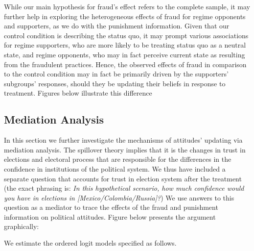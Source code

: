 \documentclass[11pt, ngerman,english,a4]{article}
\begin{document}
While our main hypothesis for fraud's effect refers to the complete sample, it may further help in exploring the heterogeneous effects of fraud for regime opponents and supporters, as we do with the punishment information. Given that our control condition is describing the status quo, it may prompt various associations for regime supporters, who are more likely to be treating status quo as a neutral state, and regime opponents, who may in fact perceive current state as resulting from the fraudulent practices. Hence, the observed effects of fraud in comparison to the control condition may in fact be primarily driven by the supporters' subgroups' responses, should they be updating their beliefs in response to treatment. Figures below illustrate this difference



    
\clearpage
\subsection*{Mediation Analysis}

\onehalfspacing
In this section we further investigate the mechanisms of attitudes' updating via mediation analysis. The spillover theory implies that it is the changes in trust in elections and electoral process that are responsible for the differences in the confidence in institutions of the political system. We thus have included a separate question that accounts for trust in election system after the treatment (the exact phrasing is: \textit{In this hypothetical scenario, how much confidence would you have in elections in [Mexico/Colombia/Russia]?}) We use answers to this question as a mediator to trace the effects of the fraud and punishment information on political attitudes. Figure below presents the argument graphically:

\begin{figure}[H]
	\centering
\end{figure}

\noindent We estimate the ordered logit models specified as follows.
\end{document}
